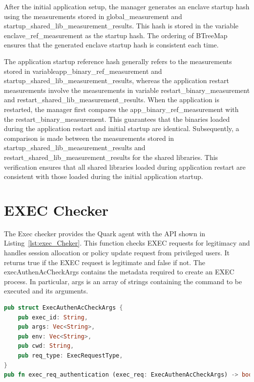 After the initial application setup, the manager generates an enclave startup hash using the measurements stored in global\_measurement and startup\_shared\_lib\_measurement\_results. This hash is stored in the variable enclave\_ref\_measurement as the startup hash. The ordering of BTreeMap 
ensures that the generated enclave startup hash is consistent each time.

The application startup reference hash generally refers to the measurements stored in variableapp\_binary\_ref\_measurement and startup\_shared\_lib\_measurement\_results, whereas the application restart measurements involve the measurements in variable restart\_binary\_measurement and 
restart\_shared\_lib\_measurement\_results. When the application is restarted, the manager first compares the app\_binary\_ref\_measurement with the restart\_binary\_measurement. This guarantees that the binaries loaded during the application restart and initial startup are identical. Subsequently, 
a comparison is made between the measurements stored in startup\_shared\_lib\_measurement\_results and restart\_shared\_lib\_measurement\_results for the shared libraries. This verification ensures that all shared libraries loaded during application restart are consistent 
with those loaded during the initial application startup.



\section{EXEC Checker}
\label{sec:impl_exec}
The Exec checker provides the Quark agent with the API shown in Listing~\ref{lst:exec_Cheker}. This function checks EXEC requests for legitimacy and handles session allocation or  policy update request from privileged users. It returns true if the EXEC request is legitimate and false if not. 
The execAuthenAcCheckArgs contains the metadata required to create an EXEC process. In particular, args is an array of strings containing the command to be executed and its arguments. 

\begin{lstlisting}[language=rust, caption= API of EXEC checker, label={lst:exec_Cheker}]
pub struct ExecAuthenAcCheckArgs {
    pub exec_id: String,
    pub args: Vec<String>,
    pub env: Vec<String>,
    pub cwd: String,
    pub req_type: ExecRequestType,
}
pub fn exec_req_authentication (exec_req: ExecAuthenAcCheckArgs) -> bool
\end{lstlisting}


